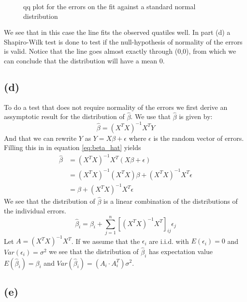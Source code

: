 \documentclass[a4paper]{article}
\begin{document}
\begin{figure}[H]
	\centering
	
	\caption{qq plot for the errors on the fit against a standard normal distribution}
	\label{fig:qqplot-1c}
\end{figure}
We see that in this case the line fits the observed quatiles well. In part (d) a Shapiro-Wilk test is done to test if the null-hypothesis of normality of the errors is valid. Notice that the line goes almost exactly through (0,0), from which we can conclude that the distribution will have a mean $0$.

\subsection*{(d)}
\noindent {}

To do a test that does not require normality of the errors we first derive an assymptotic result for the distribution of $\hat{\beta}$.
We use that $\hat{\beta}$ is given by:
\begin{equation}
	\hat{\beta} = (X^TX)^{-1} X^TY
	\label{eq:beta_hat}
\end{equation}
And that we can rewrite $Y$ as $Y=X\beta + \epsilon$ where $\epsilon$ is the random vector of errors. Filling this in in equation \ref{eq:beta_hat} yields
\begin{align*}
	\hat{\beta} &= (X^TX)^{-1} X^T (X\beta + \epsilon)\\
		    &= (X^TX)^{-1} (X^TX) \beta + (X^TX)^{-1}X^T\epsilon\\
		    &= \beta + (X^TX)^{-1}X^T\epsilon
\end{align*}
We see that the distribution of $\hat{\beta}$ is a linear combination of the distributions of the individual errors.
\begin{equation*}
	\hat{\beta}_i = \beta_i + \sum_{j=1}^{n}[(X^TX)^{-1}X^T]_{ij} \epsilon_j
\end{equation*}
Let $A = (X^TX)^{-1}X^T$. If we assume that the $\epsilon_i$ are i.i.d. with $E(\epsilon_i)=0$ and $Var(\epsilon_i)=\sigma^2$ we see that the distribution of $\hat{\beta}_i$ has expectation value $E(\hat{\beta}_i)=\beta_i$ and $Var(\hat{\beta}_i) = (A_i \cdot A_i^T) \sigma^2$. 

\subsection*{(e)}
\noindent {}
\end{document}
